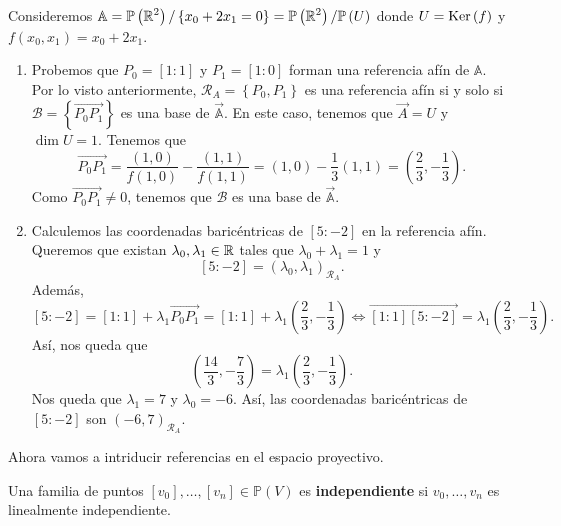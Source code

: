 \begin{eg}
	Consideremos $\displaystyle \mathbb{A} = \mathbb{P}\left(\mathbb{R}^{2}\right) / \left\{ x_{0}+2x_{1} = 0\right\} = \mathbb{P}\left(\mathbb{R}^{2}\right) / \mathbb{P}\left(U\right) $ donde $\displaystyle U = \operatorname{Ker}\left(f\right) $ y $\displaystyle f\left(x_{0},x_{1}\right) = x_{0}+2x_{1} $. 
	\begin{enumerate}
		\item Probemos que $\displaystyle P_{0} = [1:1] $ y $\displaystyle P_{1} = [1:0] $ forman una referencia afín de $\displaystyle \mathbb{A} $. Por lo visto anteriormente, $\displaystyle \mathcal{R}_{A} = \left\{ P_{0}, P_{1}\right\}  $ es una referencia afín si y solo si $\displaystyle \mathcal{B} = \left\{ \overrightarrow{P_{0}P_{1}}\right\}  $ es una base de $\displaystyle \vec{\mathbb{A}} $. En este caso, tenemos que $\displaystyle \vec{A} = U $ y $\displaystyle \dim U = 1 $. Tenemos que 
			\[\overrightarrow{P_{0}P_{1}} = \frac{\left(1,0\right)}{f\left(1,0\right)}-\frac{\left(1,1\right)}{f\left(1,1\right)} = \left(1,0\right)-\frac{1}{3}\left(1,1\right) = \left(\frac{2}{3}, -\frac{1}{3}\right) .\]
		Como $\displaystyle \overrightarrow{P_{0}P_{1}} \neq 0 $, tenemos que $\displaystyle \mathcal{B} $ es una base de $\displaystyle \vec{\mathbb{A}} $. 	
		\item Calculemos las coordenadas baricéntricas de $\displaystyle [5:-2] $ en la referencia afín. Queremos que existan $\displaystyle \lambda_{0}, \lambda_{1} \in \mathbb{R} $ tales que $\displaystyle \lambda_{0}+\lambda_{1} = 1 $ y
			\[ [5:-2] = \left(\lambda_{0}, \lambda_{1}\right)_{\mathcal{R}_{A}} .\]
			Además,
			\[[5:-2] = [1:1] + \lambda_{1}\overrightarrow{P_{0}P_{1}} = [1:1] + \lambda_{1}\left(\frac{2}{3}, -\frac{1}{3}\right) \iff \overrightarrow{[1:1][5:-2]} = \lambda_{1}\left(\frac{2}{3}, -\frac{1}{3}\right) .\]
		Así, nos queda que 
		\[\left(\frac{14}{3},-\frac{7}{3}\right) = \lambda_{1}\left(\frac{2}{3}, -\frac{1}{3}\right) .\]
		Nos queda que $\displaystyle \lambda_{1} = 7 $ y $\displaystyle \lambda_{0}=-6 $. Así, las coordenadas baricéntricas de $\displaystyle [5:-2] $ son $\displaystyle \left(-6,7\right)_{\mathcal{R}_{A}} $.	
	\end{enumerate}
\end{eg}
Ahora vamos a intriducir referencias en el espacio proyectivo. 
\begin{definition}
	Una familia de puntos $\displaystyle [v_{0}], \ldots, [v_{n}] \in \mathbb{P}\left(V\right) $ es \textbf{independiente} si $\displaystyle v_{0}, \ldots, v_{n} $ es linealmente independiente.
\end{definition}
